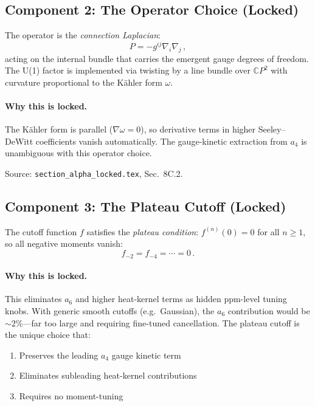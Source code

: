 \documentclass[12pt,a4paper]{article}
\begin{document}
\subsection{Component 2: The Operator Choice (Locked)}

The operator is the \emph{connection Laplacian}:
\begin{equation}
P = -g^{ij}\nabla_i\nabla_j\,,
\end{equation}
acting on the internal bundle that carries the emergent gauge degrees
of freedom. The U(1) factor is implemented via twisting by a line
bundle over $\mathbb{C}P^2$ with curvature proportional to the
K\"ahler form $\omega$.

\paragraph{Why this is locked.}
The K\"ahler form is parallel ($\nabla\omega = 0$), so derivative
terms in higher Seeley--DeWitt coefficients vanish automatically.
The gauge-kinetic extraction from $a_4$ is unambiguous with this
operator choice.

Source: \texttt{section\_alpha\_locked.tex}, Sec.~8C.2.

\subsection{Component 3: The Plateau Cutoff (Locked)}

The cutoff function $f$ satisfies the \emph{plateau condition}:
$f^{(n)}(0) = 0$ for all $n \ge 1$, so all negative moments vanish:
\begin{equation}
f_{-2} = f_{-4} = \cdots = 0\,.
\end{equation}

\paragraph{Why this is locked.}
This eliminates $a_6$ and higher heat-kernel terms as hidden
ppm-level tuning knobs. With generic smooth cutoffs (e.g.\ Gaussian),
the $a_6$ contribution would be $\sim 2\%$---far too large and requiring
fine-tuned cancellation. The plateau cutoff is the unique choice that:
\begin{enumerate}
\item Preserves the leading $a_4$ gauge kinetic term
\item Eliminates subleading heat-kernel contributions
\item Requires no moment-tuning
\end{enumerate}
\end{document}
